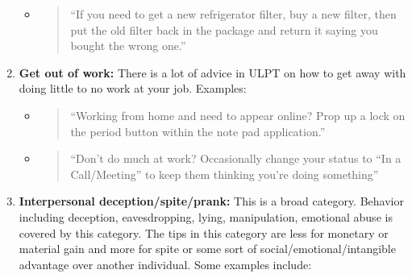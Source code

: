 \documentclass{amsart}
\theoremstyle{definition}
\theoremstyle{remark}
\newcommand{\tql}{\textquotedblleft}
\newcommand{\tqr}{\textquotedblright}
\begin{document}
\begin{enumerate}
\begin{itemize}
\item \begin{quote}
\tql If you need to get a new refrigerator filter, buy a new filter, then put the old filter back in the package and return it saying you bought the wrong one.\tqr
\end{quote}

\end{itemize}

\item \textbf{Get out of work:} There is a lot of advice in ULPT on how to get away with doing little to no work at your job.  Examples:

\begin{itemize}

\item \begin{quote}
\tql Working from home and need to appear online? Prop up a lock on the period button within the note pad application.\tqr
\end{quote}

\item \begin{quote}
\tql Don’t do much at work? Occasionally change your status to “In a Call/Meeting” to keep them thinking you’re doing something\tqr
\end{quote}

\end{itemize}

\item \textbf{Interpersonal deception/spite/prank:} This is a broad category. Behavior including deception, eavesdropping, lying, manipulation, emotional abuse is covered by this category.  The tips in this category are less for monetary or material gain and more for spite or some sort of social/emotional/intangible advantage over another individual.  Some examples include:

\begin{itemize}
%
%


\end{itemize}
\end{enumerate}
\end{document}
